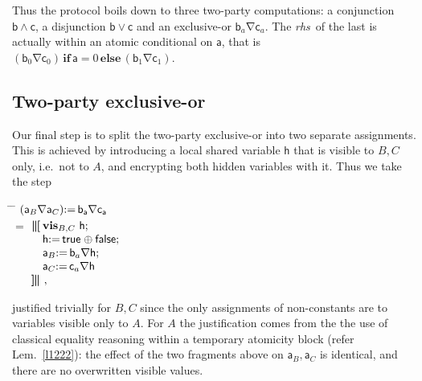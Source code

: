\documentclass[runningheads]{llncs}
\makeatletter
\newcommand\Vh {\mathsf{h}}
\newcommand\Va {\mathsf{a}}
\newcommand\Vb {\mathsf{b}}
\newcommand\Vc {\mathsf{c}}
\newcommand\Gets {{:}{=}\,}
\newcommand\RHS{\textit{rhs}}
\newcommand\PC[1] {\mathbin{_{#1}\oplus}} \newcommand\UC[1] {\mathbin{_{#1}\uplus}} \newcommand{\ITE}[3]{#1\,\IF\,#2\,\ELSE\,#3}
\newcommand\True {\textsf{true}}
\newcommand\False {\textsf{false}}
\newcommand\Xor {\mathbin{\nabla}}
\newcommand\Vis {\textbf{vis}}
\newcommand{\Begin}{\mbox{\boldmath\textbf{$\parallel\kern-.365em[$}}}
\newcommand{\End}{\mbox{\boldmath\textbf{$]\kern-.365em\parallel$}}}
\newcommand\InQuadL[1] {\makebox[0pt][l]{$#1$}\quad}
\newcommand\IF {\textbf{if}}
\newcommand\ELSE {\textbf{else}}
\newenvironment{Reason}{\vspace{-.0em}\begin{tabbing}\hspace{2em}\= \hspace{1cm} \= \kill}{\end{tabbing}\vspace{-1em}}
\newcommand\Step[2] {#1 \> $\begin{array}[t]{@{}llll}#2\end{array}$ \\}
\newcommand\Lem[1] {Lem.~\ref{#1}}
\makeatother
\begin{document}
Thus the protocol boils down to three two-party computations: a conjunction $\Vb\land \Vc$, a disjunction $\Vb\lor \Vc$ and an exclusive-or $\Vb_a{\Xor}\Vc_a$. The \RHS\ of the last is actually within an atomic conditional on $\Va$, that is $\ITE{(\Vb_0{\Xor}\Vc_0)}{\Va{=}0}{(\Vb_1{\Xor}\Vc_1)}$.

\subsection{Two-party exclusive-or}\label{s1045}

Our final step is to split the two-party exclusive-or into two separate assignments. This is achieved by introducing a local shared variable $\Vh$ that is visible to $B,C$ only, i.e.\ not to $A$, and encrypting both hidden variables with it. Thus we take the step
\begin{Reason}
\Step{}{
 (\Va_{B}{\Xor}\Va_{C})\Gets \Vb_{\Va}{\Xor}\Vc_{\Va}
}
\Space
\Step{$=$}{
  \InQuadL{\Begin}\Vis_{B,C}~\Vh; \\
  \quad \Vh\Gets\True\PC{}\False; \\
  \quad \Va_B\Gets \Vb_a {\Xor}\Vh; \\
  \quad \Va_C\Gets \Vc_a {\Xor}\Vh\\
  \End ~,
}
\end{Reason}
justified trivially for $B,C$ since the only assignments of non-constants are to variables visible only to $A$. For $A$ the justification comes from the the use of classical equality reasoning within a temporary atomicity block (refer \Lem{l1222}): the effect of the two fragments above on $\Va_B,\Va_C$ is identical, and there are no overwritten visible values.
\end{document}
